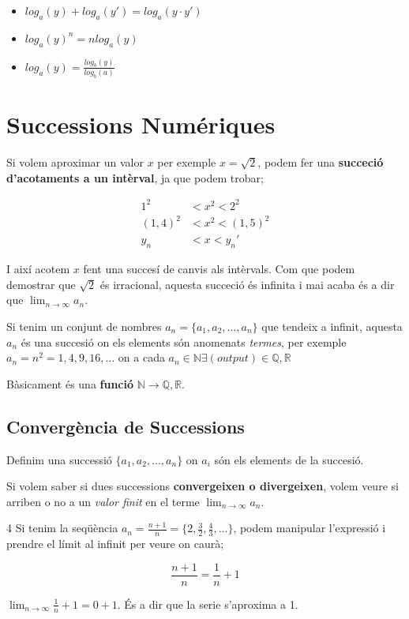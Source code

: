 \documentclass[12pt]{article}
\newcommand{\R}{\mathbb{R}}
\newcommand{\N}{\mathbb{N}}
\newcommand{\Q}{\mathbb{Q}}
\begin{document}
\begin{itemize}
    \item $log_a(y) + log_a(y') = log_a(y\cdot y')$
    \item $log_a(y)^n = n log_a(y)$
    \item $log_a(y) = \frac{log_b(y)}{log_b(a)}$
\end{itemize}

\section{Successions Numériques}

Si volem aproximar un valor $x$ per exemple $x = \sqrt{2}$, podem fer una \textbf{succeció d'acotaments a un intèrval}, ja que podem trobar;

\begin{align}
    1^2 &< x^2 < 2^2\\
    (1,4)^2&< x^2 <(1,5)^2\\
    y_n&< x < y_n'
\end{align}

I així acotem $x$ fent una succesí de canvis als intèrvals. Com que podem demostrar que $\sqrt{2}$ és irracional, aquesta succeció és infinita i mai acaba és a dir que $\lim_{n \rightarrow \infty} a_n$.

Si tenim un conjunt de nombres $a_n = \{a_1, a_2, \dots, a_n\}$ que tendeix a infinit, aquesta $a_n$ és una succesió on els elements són anomenats \textit{termes}, per exemple $a_n = n^2 = 1, 4, 9, 16, \dots$ on a cada $a_n \in \N \exists (output) \in \Q, \R$

Bàsicament és una \textbf{funció} $\N \rightarrow \Q,\R$. 

\subsection{Convergència de Successions}

Definim una successió $\{a_1, a_2, \dots, a_n\}$ on $a_i$ són els elements de la succesió.

Si volem saber si dues successions \textbf{convergeixen o divergeixen}, volem veure si arriben o no a un \textit{valor finit} en el terme $\lim_{n \rightarrow \infty} a_n$.

\begin{examplebox}{4}
    Si tenim la seqüència $a_n = \frac{n+1}{n} = \{2,\frac{3}{2}, \frac{4}{3}, \dots\}$, podem manipular l'expressió i prendre el límit al infinit per veure on caurà;

    \[\frac{n+1}{n} = \frac{1}{n} + 1\]

    $\lim_{n \rightarrow \infty} \frac{1}{n} + 1 = 0 + 1$. És a dir que la serie s'aproxima a 1. 
\end{examplebox}
\end{document}
